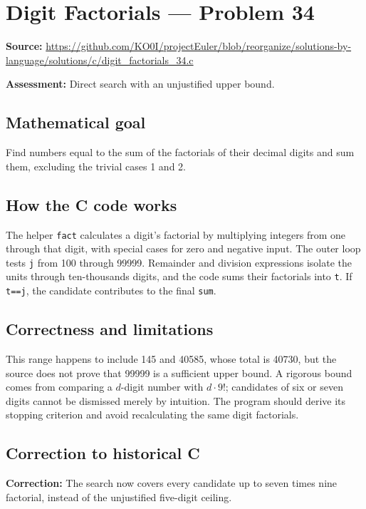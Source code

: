 \section{Digit Factorials --- Problem 34}
\label{prob:34}
\noindent\textbf{Source:} \url{https://github.com/KO0I/projectEuler/blob/reorganize/solutions-by-language/solutions/c/digit_factorials_34.c}

\noindent\textbf{Assessment:} Direct search with an unjustified upper bound.

\subsection*{Mathematical goal}
Find numbers equal to the sum of the factorials of their decimal digits and sum them, excluding the trivial cases 1 and 2.

\subsection*{How the C code works}
The helper \verb|fact| calculates a digit's factorial by multiplying integers from one through that digit, with special cases for zero and negative input. The outer loop tests \verb|j| from 100 through 99999. Remainder and division expressions isolate the units through ten-thousands digits, and the code sums their factorials into \verb|t|. If \verb|t==j|, the candidate contributes to the final \verb|sum|.

\subsection*{Correctness and limitations}
This range happens to include 145 and 40585, whose total is 40730, but the source does not prove that 99999 is a sufficient upper bound. A rigorous bound comes from comparing a \(d\)-digit number with \(d\cdot9!\); candidates of six or seven digits cannot be dismissed merely by intuition. The program should derive its stopping criterion and avoid recalculating the same digit factorials.


\subsection*{Correction to historical C}
{\color{red}\textbf{Correction:} The search now covers every candidate up to seven times nine factorial, instead of the unjustified five-digit ceiling.}
